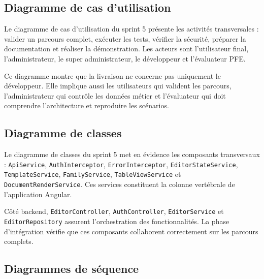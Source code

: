 \subsection{Diagramme de cas d'utilisation}


Le diagramme de cas d'utilisation du sprint 5 présente les activités transversales : valider un parcours complet, exécuter les tests, vérifier la sécurité, préparer la documentation et réaliser la démonstration. Les acteurs sont l'utilisateur final, l'administrateur, le super administrateur, le développeur et l'évaluateur PFE.

Ce diagramme montre que la livraison ne concerne pas uniquement le développeur. Elle implique aussi les utilisateurs qui valident les parcours, l'administrateur qui contrôle les données métier et l'évaluateur qui doit comprendre l'architecture et reproduire les scénarios.

\subsection{Diagramme de classes}


Le diagramme de classes du sprint 5 met en évidence les composants transversaux : \texttt{ApiService}, \texttt{AuthInterceptor}, \texttt{ErrorInterceptor}, \texttt{EditorStateService}, \texttt{TemplateService}, \texttt{FamilyService}, \texttt{TableViewService} et \texttt{DocumentRenderService}. Ces services constituent la colonne vertébrale de l'application Angular.

Côté backend, \texttt{EditorController}, \texttt{AuthController}, \texttt{EditorService} et \texttt{EditorRepository} assurent l'orchestration des fonctionnalités. La phase d'intégration vérifie que ces composants collaborent correctement sur les parcours complets.

\subsection{Diagrammes de séquence}


